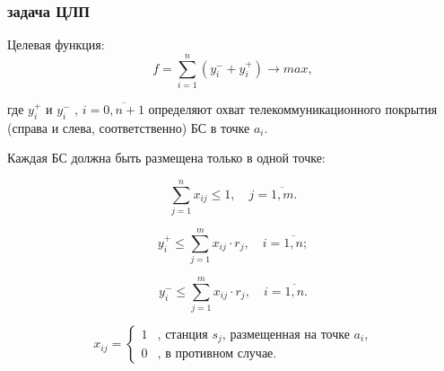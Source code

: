 \begin{frame}
    \frametitle{задача ЦЛП}
    \begin{minipage}[t]{1\linewidth}
        \fontsize{8pt}{7.2}\selectfont
        Целевая функция:
        \begin{equation}
        f =  \sum\limits_{i=1}^n (y_i^- + y_i^+) \rightarrow max,
        \end{equation}

        где $y_i^+$ и $y_i^-$ , $i= \overline{0,n+1}$ определяют охват телекоммуникационного покрытия (справа и слева, соответственно) БС  в точке $a_i$.
        \bigskip
    \end{minipage}

    \begin{minipage}[t]{0.5\linewidth} 
        \fontsize{8pt}{7.2}\selectfont
        Каждая БС должна быть размещена только в одной точке:
            
        \begin{equation}
        \label{eq:part3_xij}
        \sum\limits_{j=1}^n x_{ij} \leq 1, \quad j = \overline{1,m}. 
        \end{equation}
        
        
        
        \begin{equation}
        \label{eq:part3_yi_1}
        y_i^+ \leq \sum\limits_{j=1}^m x_{ij} \cdot r_j, \quad i = \overline{1,n};
        \end{equation}
        
        \begin{equation}
        \label{eq:part3_yi_2}
        y_i^- \leq \sum\limits_{j=1}^m x_{ij} \cdot r_j, \quad i = \overline{1,n}. 
        \end{equation}

        $$
            x_{ij} = 
             \begin{cases}
               1& \text{, станция $s_j$, размещенная на точке $a_i$,} \\
               0 & \text{, в противном случае.}
             \end{cases}
        $$

    \end{minipage}
    \hfill
    \begin{minipage}[t]{0.4\linewidth}
        
    \end{minipage}


\end{frame}

